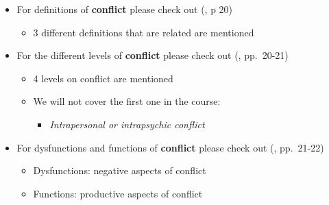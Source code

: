 \documentclass[
  ignorenonframetext,
]{beamer}
\providecommand{\tightlist}{%
  \setlength{\itemsep}{0pt}\setlength{\parskip}{0pt}}\usepackage{longtable,booktabs,array}
\begin{document}
\begin{frame}{}
\label{section-6}
\begin{itemize}
\item
  For definitions of \textbf{conflict} please check out
  (, p 20)

  \begin{itemize}
  \tightlist
  \item
    3 different definitions that are related are mentioned
  \end{itemize}
\item
  For the different levels of \textbf{conflict} please check out
  (, pp.~20-21)

  \begin{itemize}
  \item
    4 levels on conflict are mentioned
  \item
    We will not cover the first one in the course:

    \begin{itemize}
    \tightlist
    \item
      \emph{Intrapersonal or intrapsychic conflict}
    \end{itemize}
  \end{itemize}
\item
  For dysfunctions and functions of \textbf{conflict} please check out
  (, pp.~21-22)

  \begin{itemize}
  \tightlist
  \item
    Dysfunctions: negative aspects of conflict
  \item
    Functions: productive aspects of conflict
  \end{itemize}
\end{itemize}
\end{frame}
\end{document}

